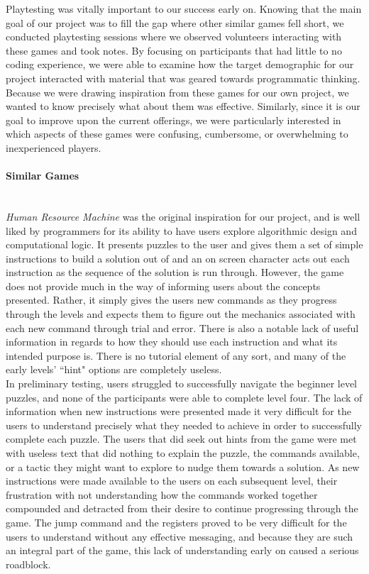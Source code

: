 Playtesting was vitally important to our success early on. Knowing that the main goal of our project was to fill the gap where other similar games fell short, we conducted playtesting sessions where we observed volunteers interacting with these games and took notes. By focusing on participants that had little to no coding experience, we were able to examine how the target demographic for our project interacted with material that was geared towards programmatic thinking. Because we were drawing inspiration from these games for our own project, we wanted to know precisely what about them was effective. Similarly, since it is our goal to improve upon the current offerings, we were particularly interested in which aspects of these games were confusing, cumbersome, or overwhelming to inexperienced players.\\

\paragraph{Similar Games}\mbox{} \\
\textit{Human Resource Machine} was the original inspiration for our project, and is well liked by programmers for its ability to have users explore algorithmic design and computational logic. It presents puzzles to the user and gives them a set of simple instructions to build a solution out of and an on screen character acts out each instruction as the sequence of the solution is run through. However, the game does not provide much in the way of informing users about the concepts presented. Rather, it simply gives the users new commands as they progress through the levels and expects them to figure out the mechanics associated with each new command through trial and error. There is also a notable lack of useful information in regards to how they should use each instruction and what its intended purpose is. There is no tutorial element of any sort, and many of the early levels' ``hint" options are completely useless.\\

In preliminary testing, users struggled to successfully navigate the beginner level puzzles, and none of the participants were able to complete level four. The lack of information when new instructions were presented made it very difficult for the users to understand precisely what they needed to achieve in order to successfully complete each puzzle. The users that did seek out hints from the game were met with useless text that did nothing to explain the puzzle, the commands available, or a tactic they might want to explore to nudge them towards a solution. As new instructions were made available to the users on each subsequent level, their frustration with not understanding how the commands worked together compounded and detracted from their desire to continue progressing through the game. The jump command and the registers proved to be very difficult for the users to understand without any effective messaging, and because they are such an integral part of the game, this lack of understanding early on caused a serious roadblock.\\

